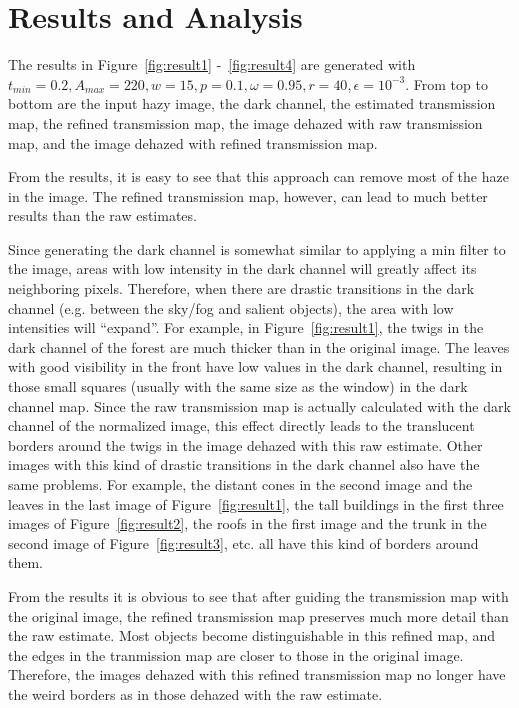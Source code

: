 \documentclass{article}
\begin{document}
\section{Results and Analysis}

The results in Figure~\ref{fig:result1} -~\ref{fig:result4} are generated with $t_{min} = 0.2, A_{max} = 220, w = 15, p=0.1, \omega=0.95,r=40, \epsilon=10^{-3}$. From top to bottom are the input hazy image, the dark channel, the estimated transmission map, the refined transmission map, the image dehazed with raw transmission map, and the image dehazed with refined transmission map.

From the results, it is easy to see that this approach can remove most of the haze in the image. The refined transmission map, however, can lead to much better results than the raw estimates.

Since generating the dark channel is somewhat similar to applying a min filter to the image, areas with low intensity in the dark channel will greatly affect its neighboring pixels. Therefore, when there are drastic transitions in the dark channel (e.g. between the sky/fog and salient objects), the area with low intensities will ``expand''. For example, in Figure~\ref{fig:result1}, the twigs in the dark channel of the forest are much thicker than in the original image. The leaves with good visibility in the front have low values in the dark channel, resulting in those small squares (usually with the same size as the window) in the dark channel map. Since the raw transmission map is actually calculated with the dark channel of the normalized image, this effect directly leads to the translucent borders around the twigs in the image dehazed with this raw estimate. Other images with this kind of drastic transitions in the dark channel also have the same problems. For example, the distant cones in the second image and the leaves in the last image of Figure~\ref{fig:result1}, the tall buildings in the first three images of Figure~\ref{fig:result2}, the roofs in the first image and the trunk in the second image of Figure~\ref{fig:result3}, etc. all have this kind of borders around them.

From the results it is obvious to see that after guiding the transmission map with the original image, the refined transmission map preserves much more detail than the raw estimate. Most objects become distinguishable in this refined map, and the edges in the tranmission map are closer to those in the original image. Therefore, the images dehazed with this refined transmission map no longer have the weird borders as in those dehazed with the raw estimate.
\end{document}
